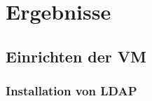 
\section{Ergebnisse}
\label{sec:Ergebnisse}

\subsection{Einrichten der VM}
\label{sec:Einrichten der VM}

\subsubsection{Installation von LDAP}
\label{sec:Installation von LDAP}

